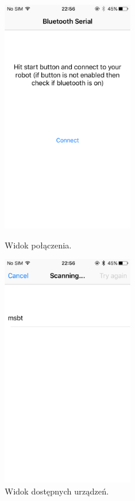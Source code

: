 \begin{figure}[H]
\centering
\begin{minipage}{.5\textwidth}
  \centering
  \includegraphics[width=.75\linewidth, height=10cm, keepaspectratio, fbox]{pic05/initial.PNG}
  \caption{Widok połączenia.}
  \label{fig:initial}
\end{minipage}%
\begin{minipage}{.5\textwidth}
  \centering
  \includegraphics[width=.75\linewidth, height=10cm, keepaspectratio, fbox]{pic05/scanning.PNG}
  \caption{Widok dostępnych urządzeń.}
  \label{fig:scanner}
\end{minipage}
\end{figure}

